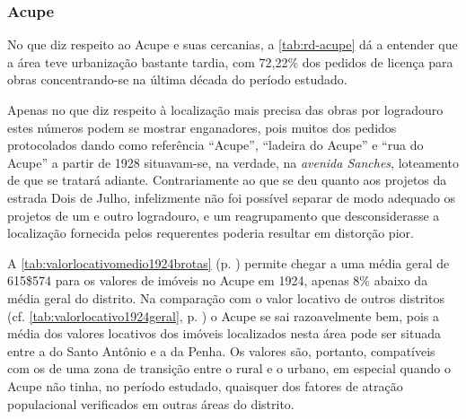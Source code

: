 \subsubsection{Acupe}\label{subsubsec:acupecap3}


No que diz respeito ao Acupe e suas cercanias, a \autoref{tab:rd-acupe} dá a entender que a área teve urbanização bastante tardia, com 72,22\% dos pedidos de licença para obras concentrando-se na última década do período estudado.





Apenas no que diz respeito à localização mais precisa das obras por logradouro estes números podem se mostrar enganadores, pois muitos dos pedidos protocolados dando como referência ``Acupe'', ``ladeira do Acupe'' e ``rua do Acupe'' a partir de 1928 situavam-se, na verdade, na \textit{avenida Sanches}, loteamento de que se tratará adiante. Contrariamente ao que se deu quanto aos projetos da estrada Dois de Julho, infelizmente não foi possível separar de modo adequado os projetos de um e outro logradouro, e um reagrupamento que desconsiderasse a localização fornecida pelos requerentes poderia resultar em distorção pior.


A \autoref{tab:valorlocativomedio1924brotas} (p. \pageref{tab:valorlocativomedio1924brotas}) permite chegar a uma média geral de 615\$574 para os valores de imóveis no Acupe em 1924, apenas 8\% abaixo da média geral do distrito. Na comparação com o valor locativo de outros distritos (cf. \autoref{tab:valorlocativo1924geral}, p. \pageref{tab:valorlocativo1924geral}) o Acupe se sai razoavelmente bem, pois a média dos valores locativos dos imóveis localizados nesta área pode ser situada entre a do Santo Antônio e a da Penha. Os valores são, portanto, compatíveis com os de uma zona de transição entre o rural e o urbano, em especial quando o Acupe não tinha, no período estudado, quaisquer dos fatores de atração populacional verificados em outras áreas do distrito.

